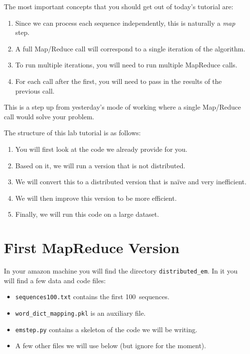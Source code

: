 The most important concepts that you should get out of today's tutorial are:

\begin{enumerate}
\item Since we can process each sequence independently, this is naturally a
\emph{map} step.
\item A full Map/Reduce call will correspond to a single iteration of the
algorithm.
\item To run multiple iterations, you will need to run multiple MapReduce
calls.
\item For each call after the first, you will need to pass in the results of
the previous call.
\end{enumerate}

This is a step up from yesterday's mode of working where a single Map/Reduce
call would solve your problem.

The structure of this lab tutorial is as follows:

\begin{enumerate}
\item You will first look at the code we already provide for you.
\item Based on it, we will run a version that is not distributed.
\item We will convert this to a distributed version that is na\"{i}ve and very inefficient.
\item We will then improve this version to be more efficient.
\item Finally, we will run this code on a large dataset.
\end{enumerate}

\section{First MapReduce Version}

In your amazon machine you will find the directory \texttt{distributed\_em}. In
it you will find a few data and code files:

\begin{itemize}
\item \verb+sequences100.txt+ contains the first 100~sequences.
\item \verb+word_dict_mapping.pkl+ is an auxiliary file.
\item \verb+emstep.py+ contains a skeleton of the code we will be writing.
\item A few other files we will use below (but ignore for the moment).
\end{itemize}

